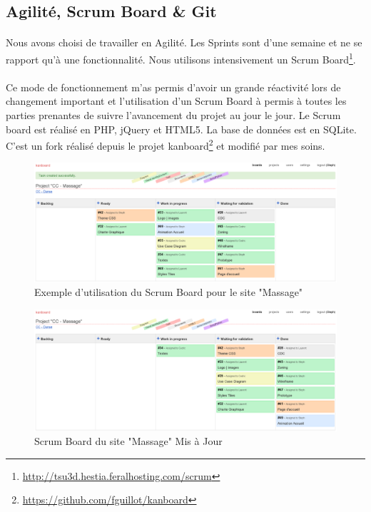 \documentclass[11pt,a4paper,twoside]{report}
\begin{document}
		\subsection{Agilité, Scrum Board \& Git}
			\paragraph*{}Nous avons choisi de travailler en Agilité. Les Sprints sont d'une semaine et ne se rapport qu'à une fonctionnalité. Nous utilisons intensivement un Scrum Board\footnote{\url{http://tsu3d.hestia.feralhosting.com/scrum}}.
			\paragraph*{}Ce mode de fonctionnement m'as permis d'avoir un grande réactivité lors de changement important et l'utilisation d'un Scrum Board à permis à toutes les parties prenantes de suivre l'avancement du projet au jour le jour.
			Le Scrum board est réalisé en PHP, jQuery et HTML5. La base de données est en SQLite. C'est un fork réalisé depuis le projet kanboard\footnote{\url{https://github.com/fguillot/kanboard}} et modifié par mes soins.
			\begin{figure}[H]
				\centering
				\includegraphics[width=\textwidth]{kanban1.eps}
				\caption[Kanban Board]{Exemple d'utilisation du Scrum Board pour le site "Massage"}
				\label{fig:Kanban Board}
			\end{figure}
			\newpage
			\begin{figure}[H]
				\centering
				\includegraphics[width=\textwidth]{kanban2.eps}
				\caption[Kanban Board]{Scrum Board du site "Massage" Mis à Jour}
				\label{fig:Kanban Board v2}
			\end{figure}
\end{document}
